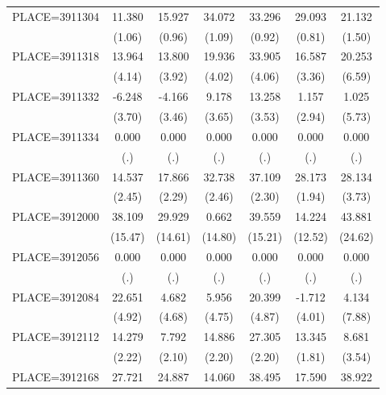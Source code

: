 {\begin{tabular}{l*{6}{c}}
PLACE=3911304       &      11.380&      15.927&      34.072&      33.296&      29.093&      21.132\\
                    &      (1.06)&      (0.96)&      (1.09)&      (0.92)&      (0.81)&      (1.50)\\
PLACE=3911318       &      13.964&      13.800&      19.936&      33.905&      16.587&      20.253\\
                    &      (4.14)&      (3.92)&      (4.02)&      (4.06)&      (3.36)&      (6.59)\\
PLACE=3911332       &      -6.248&      -4.166&       9.178&      13.258&       1.157&       1.025\\
                    &      (3.70)&      (3.46)&      (3.65)&      (3.53)&      (2.94)&      (5.73)\\
PLACE=3911334       &       0.000&       0.000&       0.000&       0.000&       0.000&       0.000\\
                    &         (.)&         (.)&         (.)&         (.)&         (.)&         (.)\\
PLACE=3911360       &      14.537&      17.866&      32.738&      37.109&      28.173&      28.134\\
                    &      (2.45)&      (2.29)&      (2.46)&      (2.30)&      (1.94)&      (3.73)\\
PLACE=3912000       &      38.109&      29.929&       0.662&      39.559&      14.224&      43.881\\
                    &     (15.47)&     (14.61)&     (14.80)&     (15.21)&     (12.52)&     (24.62)\\
PLACE=3912056       &       0.000&       0.000&       0.000&       0.000&       0.000&       0.000\\
                    &         (.)&         (.)&         (.)&         (.)&         (.)&         (.)\\
PLACE=3912084       &      22.651&       4.682&       5.956&      20.399&      -1.712&       4.134\\
                    &      (4.92)&      (4.68)&      (4.75)&      (4.87)&      (4.01)&      (7.88)\\
PLACE=3912112       &      14.279&       7.792&      14.886&      27.305&      13.345&       8.681\\
                    &      (2.22)&      (2.10)&      (2.20)&      (2.20)&      (1.81)&      (3.54)\\
PLACE=3912168       &      27.721&      24.887&      14.060&      38.495&      17.590&      38.922\\

\end{tabular}}
